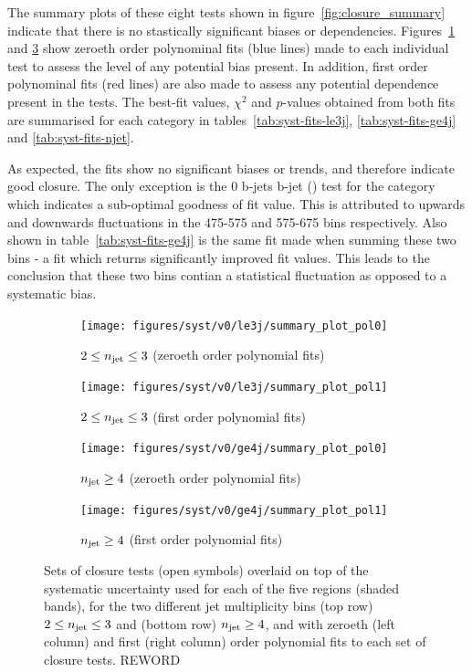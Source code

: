 The summary plots of these eight tests shown in figure~\ref{fig:closure_summary} 
indicate that there is no stastically significant biases or \HT dependencies. 
Figures~\ref{fig:closure_fit_le3j_pol0} and \ref{fig:closure_fit_ge4j_pol0} show
zeroeth order polynominal fits (blue lines) made to each individual test to assess the 
level of any potential bias present. In addition, first order polynominal fits 
(red lines) are
also made to assess any potential \HT dependence present in the tests.
The best-fit values, $\chi^2$ and $p$-values 
obtained from both fits are summarised for each \nj category in
tables~\ref{tab:syst-fits-le3j}, \ref{tab:syst-fits-ge4j} and
\ref{tab:syst-fits-njet}.

As expected, the fits show no significant biases or trends, and therefore 
indicate good closure. The only exception is the 0 b-jets  b-jet (\mj) test
for the \njhigh category
which indicates a sub-optimal goodness of fit value. This is 
attributed to upwards and downwards fluctuations in the 475-575 \gev and 575-675
\gev bins respectively. Also shown in table~\ref{tab:syst-fits-ge4j} is the 
same fit made when summing these two bins - a fit which returns significantly 
improved fit values. This leads to the conclusion that these two bins contian a 
statistical fluctuation as opposed to a systematic bias.

\begin{figure}[ht!]
  \centering
  \begin{subfigure}[b]{0.46\textwidth}
    \texttt{[image: figures/syst/v0/le3j/summary\_plot\_pol0]}
    \caption{$2 \leq n_{\text{jet}} \leq 3$ (zeroeth order polynomial fits)}
    \label{fig:closure_fit_le3j_pol0}
  \end{subfigure}
  \begin{subfigure}[b]{0.46\textwidth}
    \texttt{[image: figures/syst/v0/le3j/summary\_plot\_pol1]}
    \caption{$2 \leq n_{\text{jet}} \leq 3$ (first order polynomial fits)}
    \label{fig:closure_fit_le3j_pol1}
  \end{subfigure}
  \begin{subfigure}[b]{0.46\textwidth}
    \texttt{[image: figures/syst/v0/ge4j/summary\_plot\_pol0]}
    \caption{$n_{\text{jet}} \geq 4$ (zeroeth order polynomial fits)}
    \label{fig:closure_fit_ge4j_pol0}
  \end{subfigure}
  \begin{subfigure}[b]{0.46\textwidth}
    \texttt{[image: figures/syst/v0/ge4j/summary\_plot\_pol1]}
    \caption{$n_{\text{jet}} \geq 4$ (first order polynomial fits)}
    \label{fig:closure_fit_ge4j_pol1}
  \end{subfigure}
  \caption{Sets of closure tests (open symbols) overlaid on top of
      the systematic uncertainty used for each of the five \HT
      regions (shaded bands), for the two different jet multiplicity
      bins (top row) $2 \leq n_{\text{jet}} \leq 3$ and (bottom row) $n_{\text{jet}}
      \geq 4$, and with zeroeth (left column) and first (right column)
      order polynomial fits to each set of closure tests. REWORD}
  \label{fig:closure_fits}
\end{figure}

